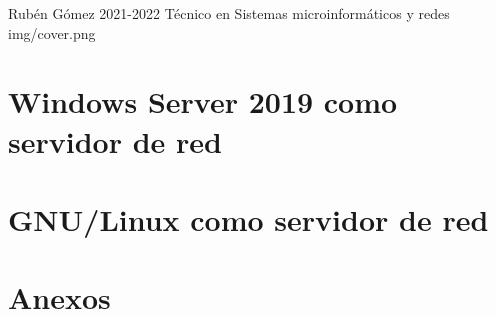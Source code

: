 \documentclass{../../../yukibook.cls/yukibook}
\begin{document}
  {Rubén Gómez}  %
  {2021-2022}    %
  {Técnico en Sistemas microinformáticos y redes} %
  {}	%
  {}	%
  {img/cover.png}

\part{Windows Server 2019 como servidor de red}
\graphicspath{{img/windows/}}


\part{GNU/Linux como servidor de red}
\graphicspath{{img/linux/}}


\part{Anexos}

\graphicspath{{../../../anexos/instalar_ubuntu_lts/}}


\graphicspath{{../../../anexos/ubuntu_raid1/}}


\graphicspath{{../../../anexos/monitorizacion_munin/}}


\graphicspath{{../../../anexos/}}

\end{document}

